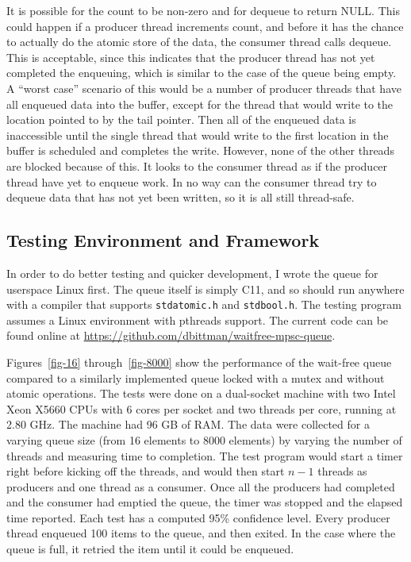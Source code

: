\documentclass[12pt]{article}
\begin{document}
It is possible for the count to be non-zero and for dequeue to return NULL. This could happen
if a producer thread increments count, and before it has the chance to actually do the
atomic store of the data, the consumer thread calls dequeue. This is acceptable, since
this indicates that the producer thread has not yet completed the enqueuing, which is
similar to the case of the queue being empty. A ``worst case'' scenario of this would
be a number of producer threads that have all enqueued data into the buffer, except for
the thread that would write to the location pointed to by the tail pointer. Then all of
the enqueued data is inaccessible until the single thread that would write to the
first location in the buffer is scheduled and completes the write. However, none of
the other threads are blocked because of this. It looks to the consumer thread as
if the producer thread have yet to enqueue work. In no way can the consumer thread
try to dequeue data that has not yet been written, so it is all still thread-safe.

\subsection{Testing Environment and Framework}
In order to do better testing and quicker
development, I wrote the queue for userspace Linux first. The queue itself is simply C11, and so should run anywhere
with a compiler that supports \texttt{stdatomic.h} and \texttt{stdbool.h}. The testing program assumes a Linux
environment with pthreads support. The current code can be found online at \url{https://github.com/dbittman/waitfree-mpsc-queue}.


Figures~\ref{fig-16} through~\ref{fig-8000} show the performance of the wait-free queue
compared to a similarly implemented queue locked with a mutex and without atomic operations.
The tests were done on a dual-socket machine with two Intel Xeon X5660 CPUs with 6 cores per
socket and two threads per core, running at 2.80 GHz. The machine had 96 GB of RAM.
The data were collected for a varying queue size (from 16 elements to 8000 elements)
by varying the number of threads and measuring time to completion. The test program
would start a timer right before kicking off the threads, and would then start $n-1$
threads as producers and one thread as a consumer. Once all the producers had completed
and the consumer had emptied the queue, the timer was stopped and the elapsed time reported.
Each test has a computed 95\% confidence level.
Every producer thread enqueued 100 items to the queue, and then exited. In the case
where the queue is full, it retried the item until it could be enqueued.
\end{document}
